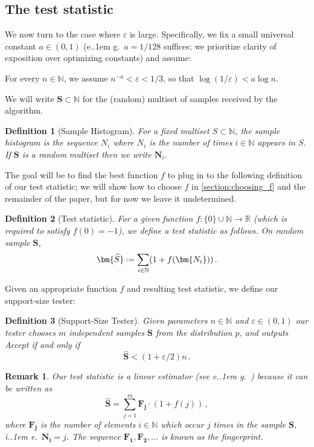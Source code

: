 \documentclass[10pt,a4paper]{article}
\newtheorem{definition}{Definition}[section]
\newtheorem{remark}{Remark}[section]
\newcommand*\ie{i.\kern.1em e.\ }
\newcommand*\eg{e.\kern.1em g.\ }
\newcommand*{\define}{\mathrel{\vcenter{\baselineskip0.5ex \lineskiplimit0pt
                      \hbox{\scriptsize.}\hbox{\scriptsize.}}}%
                      =}
\newcommand{\bN}{\ensuremath{\mathbb{N}}}
\newcommand{\bR}{\ensuremath{\mathbb{R}}}
\renewcommand{\epsilon}{\varepsilon}
\begin{document}
\subsection{The test statistic}

We now turn to the case where $\epsilon$ is large. Specifically, we fix a small universal constant
$a \in (0,1)$ (\eg $a = 1/128$ suffices; we prioritize clarity of exposition over optimizing
constants) and assume:

\begin{assumption}
\label{assumption:epsilon}
For every $n \in \bN$, we assume $n^{-a} < \epsilon < 1/3$,
so that $\log(1/\epsilon) < a \log n$.
\end{assumption}

We will write $\bm{S} \subset \bN$ for the (random) multiset of samples received by the algorithm.

\begin{definition}[Sample Histogram]
For a fixed multiset $S \subset \bN$, the \emph{sample histogram} is the sequence $N_i$ where $N_i$
is the number of times $i \in \bN$ appears in $S$. If $\bm S$ is a random multiset then we write
$\bm{N}_i$.
\end{definition}

The goal will be to find the best function $f$ to plug in to the following definition of our test
statistic; we will show how to choose $f$ in \cref{section:choosing_f} and the remainder of the
paper, but for now we leave it undetermined.

\begin{definition}[Test statistic]
\label{def:test-statistic}
For a given function $f : \{0\} \cup \bN \to \bR$ (which is required to satisfy $f(0) = -1$),
we define a test statistic as follows. On random sample $\bm S$,
\[
    \bm{\widehat S} \define \sum_{i \in \bN} (1 + f(\bm{N_i}) ) \,.
\]
\end{definition}

Given an appropriate function $f$ and resulting test statistic, we define our support-size tester:

\begin{definition}[Support-Size Tester]
\label{def:tester}
Given parameters $n \in \bN$ and $\epsilon \in (0,1)$ our tester chooses $m$ independent samples
$\bm{S}$ from the distribution $p$, and outputs \textsf{Accept} if and only if
\[
  \bm{\widehat S} < (1 + \epsilon/2) n \,.
\]
\end{definition}

\begin{remark}
Our test statistic is a \emph{linear estimator} (see \eg \cite{VV11stoc,VV11focs,VV17,WY19}) because
it can be written as
\[
  \widehat{\bm S} = \sum_{j=1}^m \bm{F_j} \cdot (1+f(j)) \,,
\]
where $\bm{F_j}$ is the number of elements $i \in \bN$ which occur $j$ times in the sample $\bm{S}$,
\ie $\bm{N_i} = j$. The sequence $\bm{F_1}, \bm{F_2}, \dotsc$ is known as the \emph{fingerprint}.
\end{remark}
\end{document}
